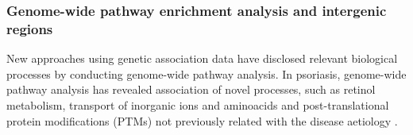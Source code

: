 
\subsubsection{Genome-wide pathway enrichment analysis and intergenic regions}

New approaches using genetic association data have disclosed relevant biological processes by conducting genome-wide pathway analysis. %
In psoriasis, genome-wide pathway analysis has revealed association of novel processes, such as retinol metabolism, transport of inorganic ions and aminoacids and post-translational protein modifications (PTMs) not previously related with the disease aetiology \parencite{Aterido2015}. 

